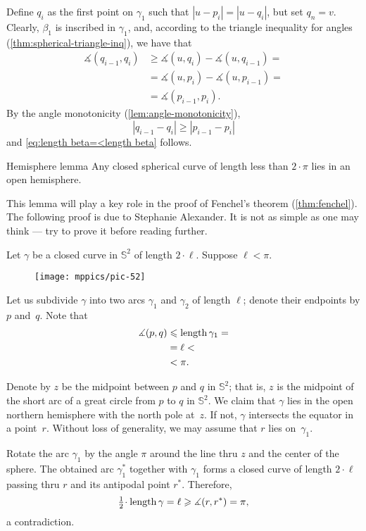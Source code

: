 Define $q_i$ as the first point on $\gamma_1$ such that $|u-p_i|=|u-q_i|$, but set $q_n=v$.
Clearly, $\beta_1$ is inscribed in $\gamma_1$, and, according to the triangle inequality for angles (\ref{thm:spherical-triangle-inq}), we have that 
\begin{align*}
 \measuredangle(q_{i-1},q_i) &\ge  \measuredangle (u, q_i) - \measuredangle ( u , q_{i-1})  =
\\
&= \measuredangle (u,p_i) - \measuredangle (u,p_{i-1}) =
\\
& = \measuredangle(p_{i-1},p_i).
\end{align*}
By the angle monotonicity (\ref{lem:angle-monotonicity}),
\[|q_{i-1}-q_i|\ge|p_{i-1}-p_i|\]
and \ref{eq:length beta=<length beta} follows.
\qeds

\begin{thm}{Hemisphere lemma}\label{lem:hemisphere}
Any closed spherical curve of length less than $2\cdot \pi$ lies in an open hemisphere. 
\end{thm}

This lemma will play a key role in the proof of Fenchel's theorem (\ref{thm:fenchel}).
The following proof is due to Stephanie Alexander.
It is not as simple as one may think --- try to prove it  before reading further.

Let $\gamma$ be a closed curve in $\mathbb{S}^2$ of length $2\cdot\ell$.
Suppose $\ell<\pi$.


\begin{wrapfigure}[8]{o}{35mm}
\vskip-0mm
\centering
\texttt{[image: mppics/pic-52]}
\end{wrapfigure}

Let us subdivide $\gamma$ into two arcs $\gamma_1$ and $\gamma_2$ of length $\ell$;
denote their endpoints by $p$ and~$q$. 
Note that 
\begin{align*}
\measuredangle(p,q)&\leqslant \mathop{\rm length}\nolimits \gamma_1=
\\
&= \ell<
\\
&<\pi.
\end{align*}

Denote by $z$ be the midpoint between $p$ and $q$ in $\mathbb{S}^2$;
that is, $z$ is the midpoint of the short arc of a great circle from $p$ to $q$ in $\mathbb{S}^2$. 
We claim that $\gamma$ lies in the open northern hemisphere with the north pole at~$z$.
If not, $\gamma$ intersects the equator in a point~$r$.
Without loss of generality, we may assume that $r$ lies on~$\gamma_1$. 

Rotate the arc $\gamma_1$ by the angle $\pi$ around the line thru $z$ and the center of the sphere.
The obtained arc $\gamma_1^{*}$ together with $\gamma_1$ forms a closed curve of length $2\cdot \ell$ passing thru $r$ and its antipodal point $r^{*}$.
Therefore,
\[\tfrac12\cdot\length \gamma=\ell\ge \measuredangle(r,r^{*})=\pi,\] 
a contradiction.
\qeds

